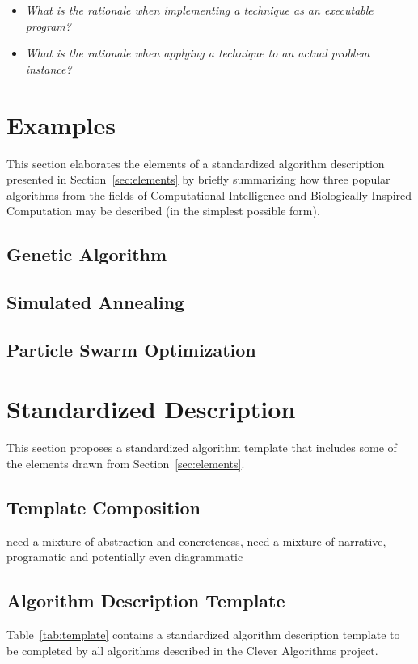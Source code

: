 \documentclass[a4paper, 11pt]{article}
\begin{document}
\begin{itemize}
	\item \emph{What is the rationale when implementing a technique as an executable program?}
	\item \emph{What is the rationale when applying a technique to an actual problem instance?}
\end{itemize}

\section{Examples} 
\label{sec:examples}
This section elaborates the elements of a standardized algorithm description presented in Section~\ref{sec:elements} by briefly summarizing how three popular algorithms from the fields of Computational Intelligence and Biologically Inspired Computation may be described (in the simplest possible form).

\subsection{Genetic Algorithm}


\subsection{Simulated Annealing}


\subsection{Particle Swarm Optimization}


\section{Standardized Description} 
\label{sec:template}
This section proposes a standardized algorithm template that includes some of the elements drawn from Section~\ref{sec:elements}.

\subsection{Template Composition}
need a mixture of abstraction and concreteness, need a mixture of narrative, programatic and potentially even diagrammatic 

\subsection{Algorithm Description Template}
Table~\ref{tab:template} contains a standardized algorithm description template to be completed by all algorithms described in the Clever Algorithms project.
\end{document}
